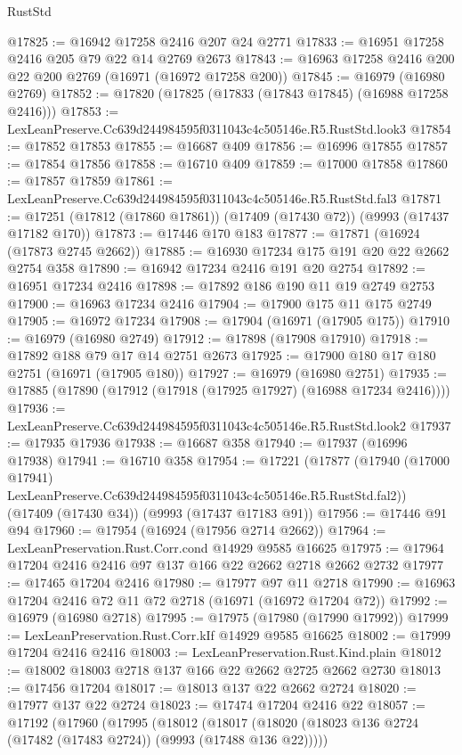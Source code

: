 \begin{lexlean}{RustStd}
\begin{coremodule}
@17825 := @16942 @17258 @2416 @207 @24 @2771
@17833 := @16951 @17258 @2416 @205 @79 @22 @14 @2769 @2673
@17843 := @16963 @17258 @2416 @200 @22 @200 @2769 (@16971 (@16972 @17258 @200))
@17845 := @16979 (@16980 @2769)
@17852 := @17820 (@17825 (@17833 (@17843 @17845) (@16988 @17258 @2416)))
@17853 := LexLeanPreserve.Cc639d244984595f0311043c4c505146e.R5.RustStd.look3
@17854 := @17852 @17853
@17855 := @16687 @409
@17856 := @16996 @17855
@17857 := @17854 @17856
@17858 := @16710 @409
@17859 := @17000 @17858
@17860 := @17857 @17859
@17861 := LexLeanPreserve.Cc639d244984595f0311043c4c505146e.R5.RustStd.fal3
@17871 := @17251 (@17812 (@17860 @17861)) (@17409 (@17430 @72)) (@9993 (@17437 @17182 @170))
@17873 := @17446 @170 @183
@17877 := @17871 (@16924 (@17873 @2745 @2662))
@17885 := @16930 @17234 @175 @191 @20 @22 @2662 @2754 @358
@17890 := @16942 @17234 @2416 @191 @20 @2754
@17892 := @16951 @17234 @2416
@17898 := @17892 @186 @190 @11 @19 @2749 @2753
@17900 := @16963 @17234 @2416
@17904 := @17900 @175 @11 @175 @2749
@17905 := @16972 @17234
@17908 := @17904 (@16971 (@17905 @175))
@17910 := @16979 (@16980 @2749)
@17912 := @17898 (@17908 @17910)
@17918 := @17892 @188 @79 @17 @14 @2751 @2673
@17925 := @17900 @180 @17 @180 @2751 (@16971 (@17905 @180))
@17927 := @16979 (@16980 @2751)
@17935 := @17885 (@17890 (@17912 (@17918 (@17925 @17927) (@16988 @17234 @2416))))
@17936 := LexLeanPreserve.Cc639d244984595f0311043c4c505146e.R5.RustStd.look2
@17937 := @17935 @17936
@17938 := @16687 @358
@17940 := @17937 (@16996 @17938)
@17941 := @16710 @358
@17954 := @17221
    (@17877
      (@17940 (@17000 @17941) LexLeanPreserve.Cc639d244984595f0311043c4c505146e.R5.RustStd.fal2))
    (@17409 (@17430 @34))
    (@9993 (@17437 @17183 @91))
@17956 := @17446 @91 @94
@17960 := @17954 (@16924 (@17956 @2714 @2662))
@17964 := LexLeanPreservation.Rust.Corr.cond @14929 @9585 @16625
@17975 := @17964 @17204 @2416 @2416 @97 @137 @166 @22 @2662 @2718 @2662 @2732
@17977 := @17465 @17204 @2416
@17980 := @17977 @97 @11 @2718
@17990 := @16963 @17204 @2416 @72 @11 @72 @2718 (@16971 (@16972 @17204 @72))
@17992 := @16979 (@16980 @2718)
@17995 := @17975 (@17980 (@17990 @17992))
@17999 := LexLeanPreservation.Rust.Corr.kIf @14929 @9585 @16625
@18002 := @17999 @17204 @2416 @2416
@18003 := LexLeanPreservation.Rust.Kind.plain
@18012 := @18002 @18003 @2718 @137 @166 @22 @2662 @2725 @2662 @2730
@18013 := @17456 @17204
@18017 := @18013 @137 @22 @2662 @2724
@18020 := @17977 @137 @22 @2724
@18023 := @17474 @17204 @2416 @22
@18057 := @17192
    (@17960
      (@17995
        (@18012
          (@18017 (@18020 (@18023 @136 @2724 (@17482 (@17483 @2724)) (@9993 (@17488 @136 @22)))))

\end{coremodule}
\end{lexlean}
